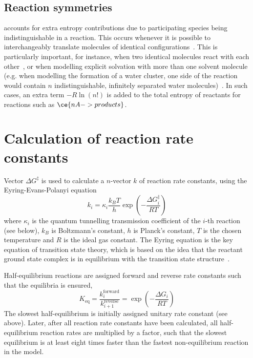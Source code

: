 \subsection{Reaction symmetries}

\overreact accounts for extra entropy contributions due to participating species being indistinguishable in a reaction.
This occurs whenever it is possible to interchangeably translate molecules of identical configurations~\cite{Fern_ndez_Ramos_2007,Gilson_2010}.
This is particularly important,
for instance,
when two identical molecules react with each other~\cite{Fern_ndez_Ramos_2007,Gilson_2010},
or when modelling explicit solvation with more than one solvent molecule (e.g.
when modelling the formation of a water cluster,
one side of the reaction would contain $n$ indistinguishable,
infinitely separated water molecules)~\cite{Jensen_2015}.
In such cases,
an extra term $-R \ln{\left( n! \right)}$ is added to the total entropy of reactants for reactions such as $\ce{n A -> products}$.

\section{Calculation of reaction rate constants}%
\label{sec:rates}

Vector $\Delta G^\ddagger$ is used to calculate a $n$-vector $k$ of reaction rate constants,
using the Eyring-Evans-Polanyi equation~\cite{Eyring_1935,Evans_1935}
% 
\begin{equation}\label{eq:rate-consts}
	k_i = \kappa_i \frac{k_B T}{h}
	\exp \left(-\frac{\Delta G_i^\ddagger}{R T} \right)
\end{equation}
% 
where $\kappa_i$ is the quantum tunnelling transmission coefficient of the $i$-th reaction (see below),
$k_B$ is Boltzmann's constant,
$h$ is Planck's constant,
$T$ is the chosen temperature and $R$ is the ideal gas constant.
The Eyring equation is the key equation of transition state theory, which is based
on the idea that the reactant ground state complex is in equilibrium
with the transition state structure~\cite{TransitionStateTheory}.

Half-equilibrium reactions are assigned forward and reverse rate constants such that the equilibria is ensured,
% 
\begin{equation}
	K_\text{eq}
	= \frac{k_i^\text{forward}}{k_{i + 1}^\text{reverse}}
	= \exp \left(-\frac{\Delta G_i}{R T} \right)
\end{equation}
% 
The slowest half-equilibrium is initially assigned unitary rate constant (see above).
Later,
after all reaction rate constants have been calculated,
all half-equilibrium reaction rates are multiplied by a factor,
such that the slowest equilibrium is at least eight times faster than the fastest non-equilibrium reaction in the model.

